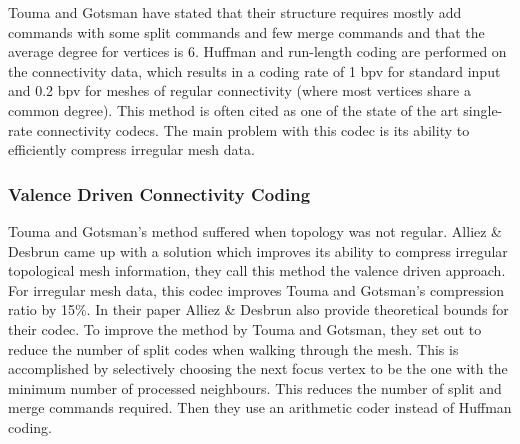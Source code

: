 Touma and Gotsman have stated that their structure requires mostly add commands with some split commands and few merge commands and that the average degree for vertices is 6. Huffman and run-length coding are performed on the connectivity data, which results in a coding rate of 1 bpv for standard input and 0.2 bpv for meshes of regular connectivity (where most vertices share a common degree). This method is often cited as one of the state of the art single-rate connectivity codecs. The main problem with this codec is its ability to efficiently compress irregular mesh data. 

\subsubsection{Valence Driven Connectivity Coding}

Touma and Gotsman's method suffered when topology was not regular. Alliez \& Desbrun \cite{Alliez01Valence-Driven} came up with a solution which improves its ability to compress irregular topological mesh information, they call this method the valence driven approach. For irregular mesh data, this codec improves Touma and Gotsman's compression ratio by 15\%. In their paper Alliez \& Desbrun also provide theoretical bounds for their codec. To improve the method by Touma and Gotsman, they set out to reduce the number of split codes when walking through the mesh. This is accomplished by selectively choosing the next focus vertex to be the one with the minimum number of processed neighbours. This reduces the number of split and merge commands required. Then they use an arithmetic coder instead of Huffman coding.

